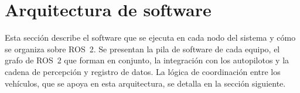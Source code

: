  
 


 
\section{Arquitectura de software}
\label{sec:arquitectura_software}
 
Esta sección describe el software que se ejecuta en cada nodo del sistema y cómo se organiza sobre ROS~2. Se presentan 
la pila de software de cada equipo, el grafo de ROS~2 que forman en conjunto, la integración con los autopilotos y la 
cadena de percepción y registro de datos. La lógica de coordinación entre los vehículos, que se apoya en esta 
arquitectura, se detalla en la sección siguiente.
 
